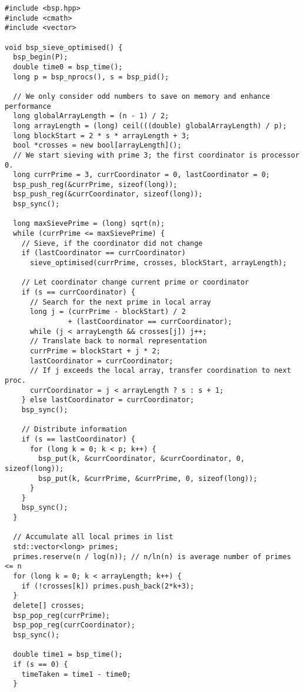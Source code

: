 \documentclass[a4paper,12pt]{article}
\begin{document}
	\begin{lstlisting}[caption={Optimised parallel program for the Sieve of Eratosthenes}, label={prg:par_opt_sieve}, frame={single}]
#include <bsp.hpp>
#include <cmath>
#include <vector>

void bsp_sieve_optimised() {
  bsp_begin(P);
  double time0 = bsp_time();
  long p = bsp_nprocs(), s = bsp_pid();

  // We only consider odd numbers to save on memory and enhance performance
  long globalArrayLength = (n - 1) / 2;
  long arrayLength = (long) ceil(((double) globalArrayLength) / p);
  long blockStart = 2 * s * arrayLength + 3;
  bool *crosses = new bool[arrayLength]();
  // We start sieving with prime 3; the first coordinator is processor 0.
  long currPrime = 3, currCoordinator = 0, lastCoordinator = 0;
  bsp_push_reg(&currPrime, sizeof(long));
  bsp_push_reg(&currCoordinator, sizeof(long));
  bsp_sync();

  long maxSievePrime = (long) sqrt(n);
  while (currPrime <= maxSievePrime) {
    // Sieve, if the coordinator did not change
    if (lastCoordinator == currCoordinator)
      sieve_optimised(currPrime, crosses, blockStart, arrayLength);

    // Let coordinator change current prime or coordinator
    if (s == currCoordinator) {
      // Search for the next prime in local array
      long j = (currPrime - blockStart) / 2
               + (lastCoordinator == currCoordinator);
      while (j < arrayLength && crosses[j]) j++;
      // Translate back to normal representation
      currPrime = blockStart + j * 2;
      lastCoordinator = currCoordinator;
      // If j exceeds the local array, transfer coordination to next proc.
      currCoordinator = j < arrayLength ? s : s + 1;
    } else lastCoordinator = currCoordinator;
    bsp_sync();

    // Distribute information
    if (s == lastCoordinator) {
      for (long k = 0; k < p; k++) {
        bsp_put(k, &currCoordinator, &currCoordinator, 0, sizeof(long));
        bsp_put(k, &currPrime, &currPrime, 0, sizeof(long));
      }
    }
    bsp_sync();
  }

  // Accumulate all local primes in list
  std::vector<long> primes;
  primes.reserve(n / log(n)); // n/ln(n) is average number of primes <= n
  for (long k = 0; k < arrayLength; k++) {
    if (!crosses[k]) primes.push_back(2*k+3);
  }
  delete[] crosses;
  bsp_pop_reg(currPrime);
  bsp_pop_reg(currCoordinator);
  bsp_sync();

  double time1 = bsp_time();
  if (s == 0) {
    timeTaken = time1 - time0;
  }
  

\end{lstlisting}
\end{document}
